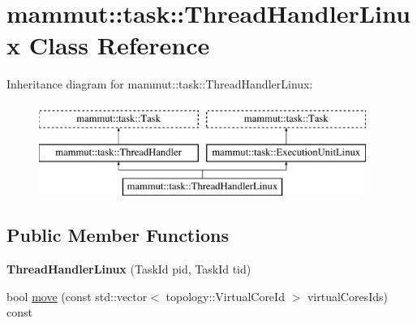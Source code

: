 \hypertarget{classmammut_1_1task_1_1ThreadHandlerLinux}{\section{mammut\-:\-:task\-:\-:Thread\-Handler\-Linux Class Reference}
\label{classmammut_1_1task_1_1ThreadHandlerLinux}
}
Inheritance diagram for mammut\-:\-:task\-:\-:Thread\-Handler\-Linux\-:\begin{figure}[H]
\begin{center}
\leavevmode
\includegraphics[height=3.000000cm]{classmammut_1_1task_1_1ThreadHandlerLinux}
\end{center}
\end{figure}
\subsection*{Public Member Functions}
\begin{DoxyCompactItemize}
\item 
\hypertarget{classmammut_1_1task_1_1ThreadHandlerLinux_a68abb28c8b0ee658cc07037548c26be0}{{\bfseries Thread\-Handler\-Linux} (Task\-Id pid, Task\-Id tid)}\label{classmammut_1_1task_1_1ThreadHandlerLinux_a68abb28c8b0ee658cc07037548c26be0}

\item 
bool \hyperlink{classmammut_1_1task_1_1ThreadHandlerLinux_a7ecc4783d78c0fdfc337800598b0165c}{move} (const std\-::vector$<$ topology\-::\-Virtual\-Core\-Id $>$ virtual\-Cores\-Ids) const 
\end{DoxyCompactItemize}


